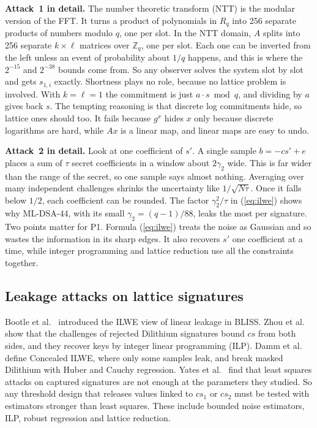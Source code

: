 \documentclass[10pt,conference,a4paper]{IEEEtran}
\begin{document}
\textbf{Attack~1 in detail.} The number theoretic transform (NTT) is the modular version of the FFT. It turns a product of
polynomials in $R_q$ into 256 separate products of numbers modulo $q$, one per slot. In the NTT domain, $A$ splits into 256
separate $k\times\ell$ matrices over $\mathbb{Z}_q$, one per slot. Each one can be inverted from the left unless an event of
probability about $1/q$ happens, and this is where the $2^{-15}$ and $2^{-38}$ bounds come from. So any observer solves the
system slot by slot and gets $s_{1,i}$ exactly. Shortness plays no role, because no lattice problem is involved. With
$k=\ell=1$ the commitment is just $a\cdot s\bmod q$, and dividing by $a$ gives back $s$. The tempting reasoning is that
discrete log commitments hide, so lattice ones should too. It fails because $g^x$ hides $x$ only because discrete logarithms
are hard, while $Ax$ is a linear map, and linear maps are easy to undo.

\textbf{Attack~2 in detail.} Look at one coefficient of $s'$. A single sample $b=-cs'+e$ places a sum of $\tau$ secret
coefficients in a window about $2\gamma_2$ wide. This is far wider than the range of the secret, so one sample says almost
nothing. Averaging over many independent challenges shrinks the uncertainty like $1/\sqrt{N\tau}$. Once it falls below
$1/2$, each coefficient can be rounded. The factor $\gamma_2^2/\tau$ in (\ref{eq:ilwe}) shows why ML-DSA-44, with its small
$\gamma_2=(q-1)/88$, leaks the most per signature. Two points matter for P1. Formula (\ref{eq:ilwe}) treats the noise as
Gaussian and so wastes the information in its sharp edges. It also recovers $s'$ one coefficient at a time, while integer
programming and lattice reduction use all the constraints together.

\subsection{Leakage attacks on lattice signatures}\label{sec:toolbox}
Bootle et al.~\cite{ilwe} introduced the ILWE view of linear leakage in BLISS. Zhou et al.~\cite{rejected} show that the
challenges of rejected Dilithium signatures bound $cs$ from both sides, and they recover keys by integer linear programming
(ILP). Damm et al.~\cite{concealed} define Concealed ILWE, where only some samples leak, and break masked Dilithium with
Huber and Cauchy regression. Yates et al.~\cite{yates} find that least squares attacks on captured signatures are not
enough at the parameters they studied. So any threshold design that releases values linked to $cs_1$ or $cs_2$ must be
tested with estimators stronger than least squares. These include bounded noise estimators, ILP, robust regression and
lattice reduction.
\end{document}
